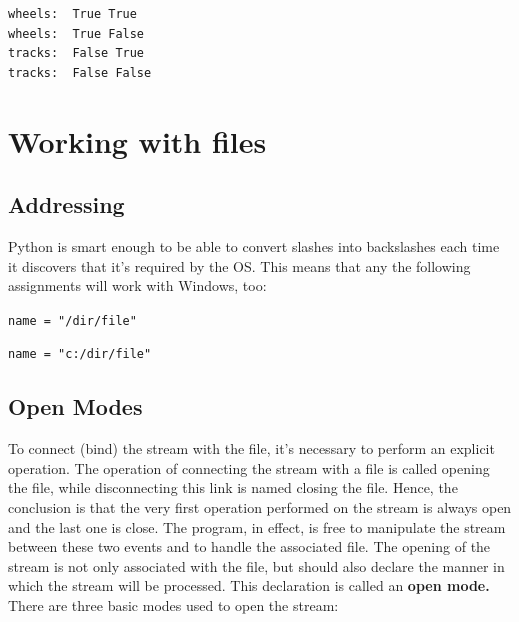 \documentclass[11pt]{article}
\begin{document}
\begin{verbatim}
wheels:  True True
wheels:  True False
tracks:  False True
tracks:  False False
\end{verbatim}

\newpage

\section{Working with files}
\label{sec:orge36a5c1}
\subsection{Addressing}
\label{sec:org7d615dc}
Python is smart enough to be able to convert slashes into backslashes
each time it discovers that it’s required by the OS. This means that
any the following assignments will work with Windows, too:

\texttt{name = "/dir/file"}

\texttt{name = "c:/dir/file"}

\subsection{Open Modes}
\label{sec:orge18fc21}
To connect (bind) the stream with the file, it’s necessary to perform
an explicit operation.  The operation of connecting the stream with a
file is called opening the file, while disconnecting this link is
named closing the file.  Hence, the conclusion is that the very first
operation performed on the stream is always open and the last one is
close. The program, in effect, is free to manipulate the stream
between these two events and to handle the associated file. The
opening of the stream is not only associated with the file, but should
also declare the manner in which the stream will be processed. This
declaration is called an \textbf{open mode.} There are three basic modes used
to open the stream:
\end{document}

